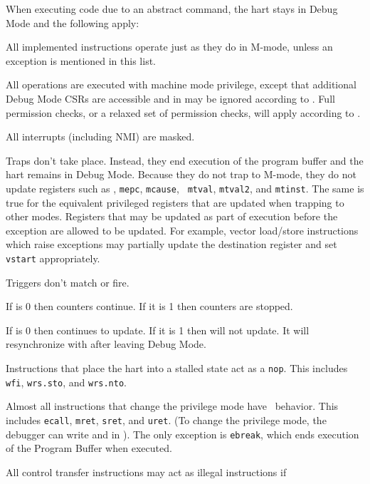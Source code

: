 \begin{steps}{When executing code due to an abstract command, the hart stays in
    Debug Mode and the following apply:}
\item All implemented instructions operate just as they do in M-mode, unless
    an exception is mentioned in this list.
\item All operations are executed with machine mode privilege, except that
    additional Debug Mode CSRs are accessible and
    \FcsrMstatusMprv in \Rmstatus may be ignored according to \FcsrDcsrMprven.
    Full permission checks, or a relaxed set of permission checks, will apply
    according to \FdmAbstractcsRelaxedpriv.
\item All interrupts (including NMI) are masked.
\item Traps don't take place. Instead, they end execution of the program buffer
    and the hart remains in Debug Mode. Because they do not trap to M-mode, they
    do not update registers such as \Rmstatus, {\tt mepc}, {\tt mcause}, {\tt
    mtval}, {\tt mtval2}, and {\tt mtinst}.  The same is true for the equivalent
    privileged registers that are updated when trapping to other modes.
    Registers that may be updated as part of execution before the exception are
    allowed to be updated.  For example, vector load/store instructions which
    raise exceptions may partially update the destination register and set
    {\tt vstart} appropriately.
\item Triggers don't match or fire.
\item If \FcsrDcsrStopcount is 0 then counters continue. If it is 1 then
    counters are stopped.
\item If \FcsrDcsrStoptime is 0 then \Rtime continues to update. If
    it is 1 then \Rtime will not update. It will resynchronize with
    \Rmtime after leaving Debug Mode.
\item Instructions that place the hart into a stalled state act as a {\tt nop}.
    This includes {\tt wfi}, {\tt wrs.sto}, and {\tt wrs.nto}.
\item Almost all instructions that change the privilege mode have \unspecified\
    behavior.  This includes {\tt ecall}, {\tt mret}, {\tt sret}, and {\tt uret}.
    (To change the privilege mode, the debugger can write
    \FcsrDcsrPrv and \FcsrDcsrV in \RcsrDcsr). The only exception is {\tt ebreak}, which ends
    execution of the Program Buffer when executed.
\item All control transfer instructions may act as illegal instructions if

\end{steps}

